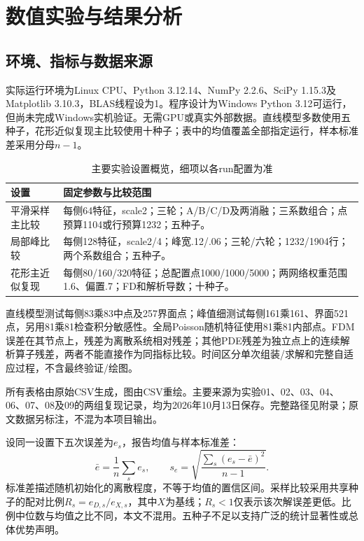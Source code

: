 \chapter{数值实验与结果分析}
\section{环境、指标与数据来源}
实际运行环境为Linux CPU、Python 3.12.14、NumPy 2.2.6、SciPy 1.15.3及Matplotlib 3.10.3，BLAS线程设为1。程序设计为Windows Python 3.12可运行，但尚未完成Windows实机验证。无需GPU或真实外部数据。直线模型多数使用五种子，花形近似复现主比较使用十种子；表中的均值覆盖全部指定运行，样本标准差采用分母$n-1$。

\begin{table}[htbp]\centering\small
\caption{主要实验设置概览，细项以各run配置为准}\label{tab:protocol_overview}
\begin{tabular}{lp{}}\toprule
设置 & 固定参数与比较范围\\\midrule
平滑采样主比较 & 每侧64特征，scale2；三轮；A/B/C/D及两消融；三系数组合；点预算1104或行预算1232；五种子。\\
局部峰比较 & 每侧128特征，scale2/4；峰宽.12/.06；三轮/六轮；1232/1904行；两个系数组合；五种子。\\
花形主近似复现 & 每侧80/160/320特征；总配置点1000/1000/5000；两网络权重范围1.6、偏置.7；FD和解析导数；十种子。\\
\bottomrule\end{tabular}\end{table}

直线模型测试每侧83乘83中点及257界面点；峰值细测试每侧161乘161、界面521点，另用81乘81检查积分敏感性。全局Poisson随机特征使用81乘81内部点。FDM误差在其节点上，残差为离散系统相对残差；其他PDE残差为独立点上的连续解析算子残差，两者不能直接作为同指标比较。时间区分单次组装/求解和完整自适应过程，不含最终验证/绘图。

所有表格由原始CSV生成，图由CSV重绘。主要来源为实验01、02、03、04、06、07、08及09的两组复现记录，均为2026年10月13日保存。完整路径见附录；原文数据另标注，不混为本项目输出。

设同一设置下五次误差为$e_s$，报告均值与样本标准差：
\[\bar e=\frac1n\sum_s e_s,\qquad s_e=\sqrt{\frac{\sum_s(e_s-\bar e)^2}{n-1}}.\]
标准差描述随机初始化的离散程度，不等于均值的置信区间。采样比较采用共享种子的配对比例$R_s=e_{D,s}/e_{X,s}$，其中$X$为基线；$R_s<1$仅表示该次解误差更低。比例中位数与均值之比不同，本文不混用。五种子不足以支持广泛的统计显著性或总体优势声明。

